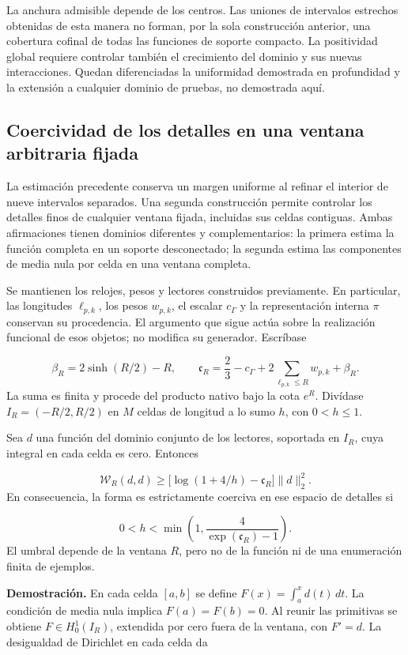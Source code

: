 La anchura admisible depende de los centros. Las uniones de intervalos estrechos obtenidas de esta manera no forman, por la sola construcción anterior, una cobertura cofinal de todas las funciones de soporte compacto. La positividad global requiere controlar también el crecimiento del dominio y sus nuevas interacciones. Quedan diferenciadas la uniformidad demostrada en profundidad y la extensión a cualquier dominio de pruebas, no demostrada aquí.

\subsection{Coercividad de los detalles en una ventana arbitraria fijada}
\label{rz:detalles}
La estimación precedente conserva un margen uniforme al refinar el interior de nueve intervalos separados. Una segunda construcción permite controlar los detalles finos de cualquier ventana fijada, incluidas sus celdas contiguas. Ambas afirmaciones tienen dominios diferentes y complementarios: la primera estima la función completa en un soporte desconectado; la segunda estima las componentes de media nula por celda en una ventana completa.

Se mantienen los relojes, pesos y lectores construidos previamente. En particular, las longitudes \(\ell_{p,k}\), los pesos \(w_{p,k}\), el escalar \(c_\Gamma\) y la representación interna \(\pi\) conservan su procedencia. El argumento que sigue actúa sobre la realización funcional de esos objetos; no modifica su generador. Escríbase

\[
\beta_R=2\sinh(R/2)-R,\qquad
\mathfrak c_R=\frac23-c_\Gamma+
2\sum_{\ell_{p,k}\leq R}w_{p,k}+\beta_R.
\]
La suma es finita y procede del producto nativo bajo la cota \(e^R\). Divídase \(I_R=(-R/2,R/2)\) en \(M\) celdas de longitud a lo sumo \(h\), con \(0<h\leq1\).

Sea \(d\) una función del dominio conjunto de los lectores, soportada en \(I_R\), cuya integral en cada celda es cero. Entonces

\[
\boxed{\mathscr W_R(d,d)\geq
\bigl[\log(1+4/h)-\mathfrak c_R\bigr]\|d\|_2^2.}
\]
En consecuencia, la forma es estrictamente coerciva en ese espacio de detalles si

\[
0<h<\min\left(1,\frac4{\exp(\mathfrak c_R)-1}\right).
\]
El umbral depende de la ventana \(R\), pero no de la función ni de una enumeración finita de ejemplos.

\textbf{Demostración.} En cada celda \([a,b]\) se define \(F(x)=\int_a^x d(t)\,dt\). La condición de media nula implica \(F(a)=F(b)=0\). Al reunir las primitivas se obtiene \(F\in H_0^1(I_R)\), extendida por cero fuera de la ventana, con \(F'=d\). La desigualdad de Dirichlet en cada celda da

